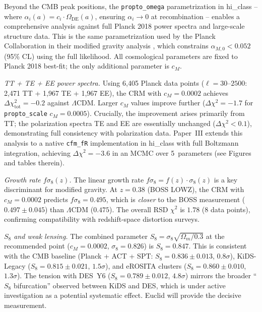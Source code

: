 \documentclass[aps,prd,twocolumn,superscriptaddress,nofootinbib,floatfix]{revtex4-2}
\begin{document}
Beyond the CMB peak positions, the \texttt{propto\_omega} parametrization in hi\_class \cite{Zumalacarregui2017} -- where $\alpha_i(a) = c_i \cdot \Omega_{\mathrm{DE}}(a)$, ensuring $\alpha_i \to 0$ at recombination -- enables a comprehensive analysis against full Planck 2018 power spectra and large-scale structure data. This is the same parametrization used by the Planck Collaboration in their modified gravity analysis \cite{PlanckMG2016}, which constrains $\alpha_{M,0} < 0.052$ (95\% CL) using the full likelihood. All cosmological parameters are fixed to Planck 2018 best-fit; the only additional parameter is $c_M$.

\textit{TT + TE + EE power spectra.} Using 6{,}405 Planck data points ($\ell = 30$--$2500$: 2{,}471 TT + 1{,}967 TE + 1{,}967 EE), the CRM with $c_M = 0.0002$ achieves $\Delta\chi^2_{\mathrm{tot}} = -0.2$ against $\Lambda$CDM. Larger $c_M$ values improve further ($\Delta\chi^2 = -1.7$ for \texttt{propto\_scale} $c_M = 0.0005$). Crucially, the improvement arises primarily from TT; the polarization spectra TE and EE are essentially unchanged ($\Delta\chi^2 < 0.1$), demonstrating full consistency with polarization data. Paper~III \cite{Geiger2026c} extends this analysis to a native \texttt{cfm\_fR} implementation in hi\_class with full Boltzmann integration, achieving $\Delta\chi^2 = -3.6$ in an MCMC over 5~parameters (see Figures and tables therein).

\textit{Growth rate $f\sigma_8(z)$.} The linear growth rate $f\sigma_8 = f(z) \cdot \sigma_8(z)$ is a key discriminant for modified gravity. At $z = 0.38$ (BOSS LOWZ), the CRM with $c_M = 0.0002$ predicts $f\sigma_8 = 0.495$, which is \textit{closer} to the BOSS measurement ($0.497 \pm 0.045$) than $\Lambda$CDM ($0.475$). The overall RSD $\chi^2$ is $1.78$ (8 data points), confirming compatibility with redshift-space distortion surveys.

\textit{$S_8$ and weak lensing.} The combined parameter $S_8 = \sigma_8\sqrt{\Omega_m/0.3}$ at the recommended point ($c_M = 0.0002$, $\sigma_8 = 0.826$) is $S_8 = 0.847$. This is consistent with the CMB baseline (Planck + ACT + SPT: $S_8 = 0.836 \pm 0.013$, $0.8\sigma$), KiDS-Legacy ($S_8 = 0.815 \pm 0.021$, $1.5\sigma$), and eROSITA clusters ($S_8 = 0.860 \pm 0.010$, $1.3\sigma$). The tension with DES~Y6 ($S_8 = 0.789 \pm 0.012$, $4.8\sigma$) mirrors the broader ``$S_8$ bifurcation'' observed between KiDS and DES, which is under active investigation as a potential systematic effect. Euclid will provide the decisive measurement.
\end{document}
